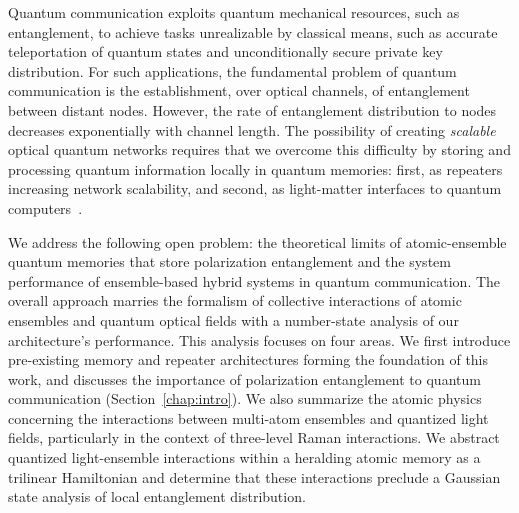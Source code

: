 \documentclass[aps,twocolumn,secnumarabic,amsmath,amssymb,pra,groupedaddress,
showpacs, showkeys]{revtex4-1}
\begin{document}
Quantum communication exploits quantum mechanical resources, such as
entanglement, to achieve tasks unrealizable by classical means, such as
accurate teleportation of quantum states and unconditionally secure private key
distribution. For such applications, the fundamental problem of quantum
communication is the establishment, over optical channels, of entanglement
between distant nodes. However, the rate of entanglement distribution to nodes
decreases exponentially with channel length. The possibility of creating
\emph{scalable} optical quantum networks requires that we overcome this
difficulty by storing and processing quantum information locally in quantum
memories: first, as repeaters increasing network scalability, and second, as
light-matter interfaces to quantum computers~\cite{nature07127}.

We address the following open problem: the theoretical limits of
atomic-ensemble quantum memories that store polarization entanglement and the
system performance of ensemble-based hybrid systems in quantum
communication. The overall approach marries the formalism of collective
interactions of atomic ensembles and quantum optical fields with a number-state
analysis of our architecture's performance. This analysis focuses on four
areas. We first introduce pre-existing memory and repeater architectures
forming the foundation of this work, and discusses the importance of
polarization entanglement to quantum communication
(Section~\ref{chap:intro}). We also summarize the atomic physics concerning the
interactions between multi-atom ensembles and quantized light fields,
particularly in the context of three-level Raman interactions. We abstract
quantized light-ensemble interactions within a heralding atomic memory as a
trilinear Hamiltonian and determine that these interactions preclude a Gaussian
state analysis of local entanglement distribution.
\end{document}
